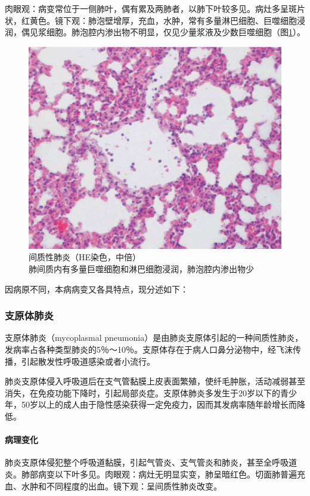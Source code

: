 肉眼观：病变常位于一侧肺叶，偶有累及两肺者，以肺下叶较多见。病灶多呈斑片状，红黄色。镜下观：肺泡壁增厚，充血，水肿，常有多量淋巴细胞、巨噬细胞浸润，偶见浆细胞。肺泡腔内渗出物不明显，仅见少量浆液及少数巨噬细胞（图\ref{fig7-12}）。

\begin{figure}[!htbp]
 \centering
 \includegraphics{./images/Image00121.jpg}
 \captionsetup{justification=centering}
 \caption{间质性肺炎（HE染色，中倍）\\ {\small 肺间质内有多量巨噬细胞和淋巴细胞浸润，肺泡腔内渗出物少}}
\label{fig7-12}
  \end{figure}

因病原不同，本病病变又各具特点，现分述如下：

\subsubsection{支原体肺炎}

支原体肺炎（mycoplasmal
pneumonia）是由肺炎支原体引起的一种间质性肺炎，发病率占各种类型肺炎的5％～10％。支原体存在于病人口鼻分泌物中，经飞沫传播，引起散发性呼吸道感染或者小流行。

肺炎支原体侵入呼吸道后在支气管黏膜上皮表面繁殖，使纤毛肿胀，活动减弱甚至消失，在免疫功能下降时，引起局部炎症。支原体肺炎多发生于20岁以下的青少年，50岁以上的成人由于隐性感染获得一定免疫力，因而其发病率随年龄增长而降低。

\paragraph{病理变化}
肺炎支原体侵犯整个呼吸道黏膜，引起气管炎、支气管炎和肺炎，甚至全呼吸道炎。肺部病变以下叶多见。肉眼观：病灶无明显实变，肺呈暗红色。切面肺普遍充血、水肿和不同程度的出血。镜下观：呈间质性肺炎改变。

